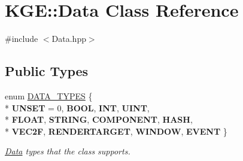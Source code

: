 \hypertarget{class_k_g_e_1_1_data}{\section{K\-G\-E\-:\-:Data Class Reference}
\label{class_k_g_e_1_1_data}
}


{\ttfamily \#include $<$Data.\-hpp$>$}

\subsection*{Public Types}
\begin{DoxyCompactItemize}
\item 
enum \hyperlink{class_k_g_e_1_1_data_acc872a3e856e6d9b554d36d9f534308f}{D\-A\-T\-A\-\_\-\-T\-Y\-P\-E\-S} \{ \\*
{\bfseries U\-N\-S\-E\-T} = 0, 
{\bfseries B\-O\-O\-L}, 
{\bfseries I\-N\-T}, 
{\bfseries U\-I\-N\-T}, 
\\*
{\bfseries F\-L\-O\-A\-T}, 
{\bfseries S\-T\-R\-I\-N\-G}, 
{\bfseries C\-O\-M\-P\-O\-N\-E\-N\-T}, 
{\bfseries H\-A\-S\-H}, 
\\*
{\bfseries V\-E\-C2\-F}, 
{\bfseries R\-E\-N\-D\-E\-R\-T\-A\-R\-G\-E\-T}, 
{\bfseries W\-I\-N\-D\-O\-W}, 
{\bfseries E\-V\-E\-N\-T}
 \}
\begin{DoxyCompactList}\small\item\em \hyperlink{class_k_g_e_1_1_data}{Data} types that the class supports. \end{DoxyCompactList}\end{DoxyCompactItemize}

